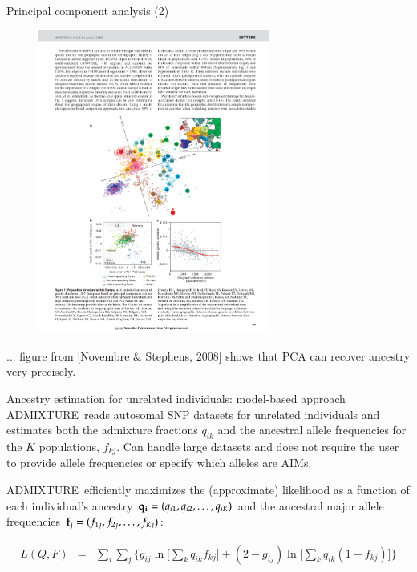 \documentclass[serif,professionalfonts,svgnames]{beamer}
\newcommand{\admixture}{\textsc{ADMIXTURE}}
\begin{document}
\begin{frame}{Principal component analysis (2)}
  \begin{figure}[htbp]
    \centering
    \includegraphics[width=3in]{novembre-pca.pdf}
   \label{fig:novembre-pca}
  \end{figure}
  \vspace{-0.25in}
  ... figure from [Novembre \& Stephens, 2008] shows that PCA can recover
  ancestry very precisely.
\end{frame}




\begin{frame}{Ancestry estimation for unrelated individuals: model-based approach}
 \admixture\ reads autosomal SNP datasets for unrelated individuals
  and estimates both the admixture fractions $q_{ik}$ and the
  ancestral allele frequencies for the $K$ populations, $f_{kj}$. Can
  handle large datasets and does not require the user to provide
  allele frequencies or specify which alleles are AIMs.

  \admixture\ efficiently maximizes the (approximate) likelihood as a
  function of each individual's ancestry ${\bf q_i} = (q_{i1}, q_{i2},
  \ldots, q_{iK})$ and the ancestral major allele frequencies ${\bf
    f_j} = (f_{1j}, f_{2j}, \ldots, f_{Kj})$:

  \begin{align*}
    L(Q,F) & = &  \sum_i \sum_j \Big\{g_{ij} \ln\Big[\sum_k q_{ik} f_{kj}\Big]+ 
    (2-g_{ij}) \ln\Big[\sum_k q_{ik} (1-f_{kj}) \Big] \Big\}
  \end{align*}
\end{frame}
\end{document}
